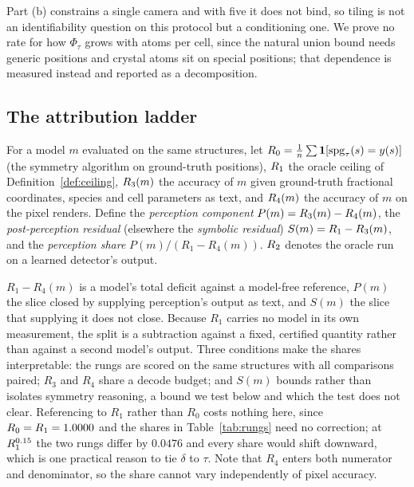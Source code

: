 Part (b) constrains a single camera and with five it does not bind, so tiling is not an identifiability
question on this protocol but a conditioning one. We prove no rate for how $\Phi_\tau$ grows with atoms per
cell, since the natural union bound needs generic positions and crystal atoms sit on special positions; that
dependence is measured instead and reported as a decomposition.

\subsection{The attribution ladder}
\label{sec:ladder}

\begin{definition}
\label{def:ladder}
For a model $m$ evaluated on the same structures, let
$R_0 = \tfrac{1}{n}\sum \mathbf{1}[\mathrm{spg}_\tau(s) = y(s)]$ (the symmetry algorithm on ground-truth positions),
$R_1$ the oracle ceiling of Definition~\ref{def:ceiling},
$R_3(m)$ the accuracy of $m$ given ground-truth fractional coordinates, species and cell parameters as
text, and
$R_4(m)$ the accuracy of $m$ on the pixel renders. Define the \emph{perception component}
$P(m) = R_3(m) - R_4(m)$, the \emph{post-perception residual} (elsewhere the \emph{symbolic residual})
$S(m) = R_1 - R_3(m)$, and the \emph{perception share} $P(m) / (R_1 - R_4(m))$. $R_2$ denotes the oracle run
on a learned detector's output.
\end{definition}

$R_1 - R_4(m)$ is a model's total deficit against a model-free reference, $P(m)$ the slice closed by supplying
perception's output as text, and $S(m)$ the slice that supplying it does not close. Because $R_1$ carries no
model in its own measurement, the split is a subtraction against a fixed, certified quantity rather than
against a second model's output. Three conditions make the shares interpretable: the rungs are scored on the
same structures with all comparisons paired; $R_3$ and $R_4$ share a decode budget; and $S(m)$ bounds rather
than isolates symmetry reasoning, a bound we test below and which the test does not clear. Referencing to
$R_1$ rather than $R_0$ costs nothing here, since $R_0 = R_1 = 1.0000$ and the shares in
Table~\ref{tab:rungs} need no correction; at $R_1^{0.15}$ the two rungs differ by $0.0476$ and every share
would shift downward, which is one practical reason to tie $\delta$ to $\tau$. Note that $R_4$ enters both
numerator and denominator, so the share cannot vary independently of pixel accuracy.

